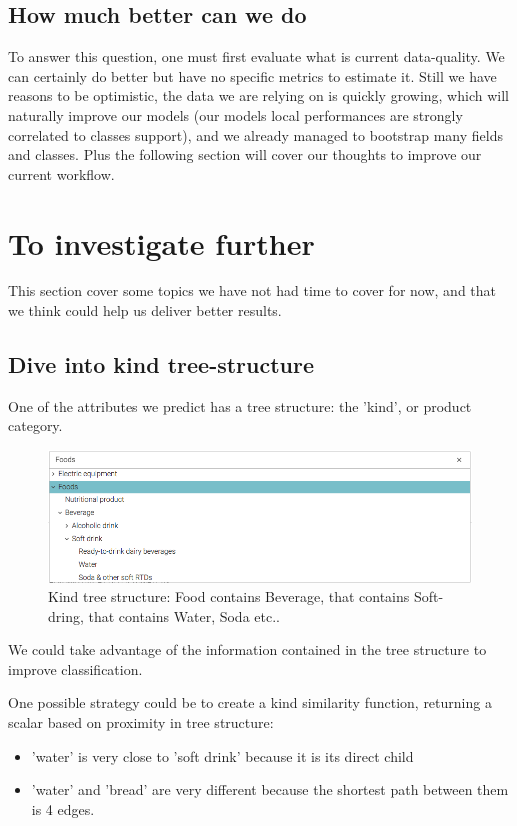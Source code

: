 \subsection{How much better can we do}

To answer this question, one must first evaluate what is current data-quality. We can certainly do better but have no specific metrics to estimate it. Still we have reasons to be optimistic, the data we are relying on is quickly growing, which will naturally improve our models (our models local performances are strongly correlated to classes support), and we already managed to bootstrap many fields and classes. Plus the following section will cover our thoughts to improve our current workflow.


\section{To investigate further}

This section cover some topics we have not had time to cover for now, and that we think could help us deliver better results.

\subsection{Dive into kind tree-structure}
One of the attributes we predict has a tree structure: the 'kind', or product category. 

\begin{figure}[H]
\centering
\includegraphics[scale=0.5]{./images/to-investigate/tree-structure.png}
\caption{Kind tree structure: Food contains Beverage, that contains Soft-dring, that contains Water, Soda etc..}
\end{figure}

We could take advantage of the information contained in the tree structure to improve classification. 

One possible strategy could be to create a kind similarity function, returning a scalar based on proximity in tree structure:
\begin{itemize}
	\item 'water' is very close to 'soft drink' because it is its direct child
	\item 'water' and 'bread' are very different because the shortest path between them is 4 edges.
\end{itemize}

